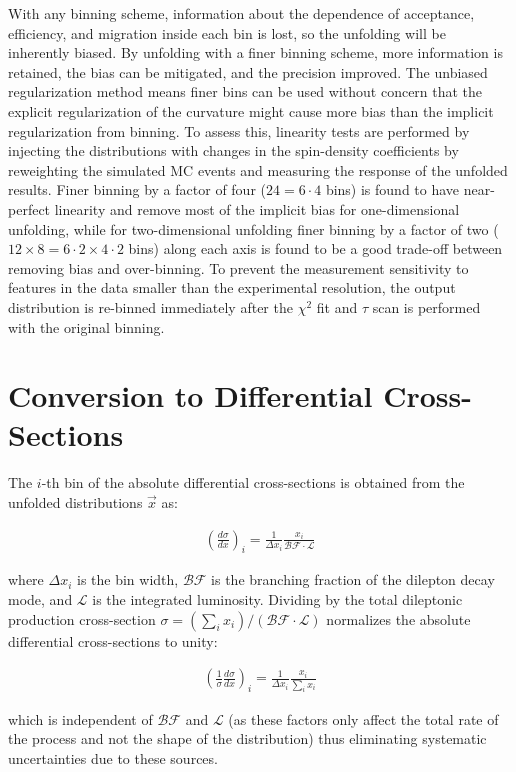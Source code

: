 \begin{refsection}
With any binning scheme, information about the dependence of acceptance, efficiency, and migration inside each bin is lost, so the unfolding will be inherently biased.
By unfolding with a finer binning scheme, more information is retained, the bias can be mitigated, and the precision improved.
The unbiased regularization method means finer bins can be used without concern that the explicit regularization of the curvature might cause more bias than the implicit regularization from binning.
To assess this, linearity tests are performed by injecting the distributions with changes in the spin-density coefficients by reweighting the simulated MC events and measuring the response of the unfolded results.
Finer binning by a factor of four ($24 = 6 \cdot 4$ bins) is found to have near-perfect linearity and remove most of the implicit bias for one-dimensional unfolding, while for two-dimensional unfolding finer binning by a factor of two ($12 \times 8 = 6 \cdot 2 \times 4 \cdot 2$ bins) along each axis is found to be a good trade-off between removing bias and over-binning.
To prevent the measurement sensitivity to features in the data smaller than the experimental resolution, the output distribution is re-binned immediately after the $\chi^2$ fit and $\tau$ scan is performed with the original binning.

\section{Conversion to Differential Cross-Sections}
The $i$-th bin of the absolute differential cross-sections is obtained from the unfolded distributions $\vec{x}$ as:
\begin{linenomath*}
\begin{align}
\left( \frac{d\sigma}{dx} \right)_i = \frac{1}{\Delta x_i} \frac{x_i}{\mathcal{BF} \cdot \mathcal{L}} 
\end{align}
\end{linenomath*}
where $\Delta x_i$ is the bin width, $\mathcal{BF}$ is the branching fraction of the \ttbar dilepton decay mode, and $\mathcal{L}$ is the integrated luminosity.
Dividing by the total dileptonic \ttbar production cross-section $\sigma =  (\sum_i x_i) / (\mathcal{BF} \cdot \mathcal{L})$ normalizes the absolute differential cross-sections to unity:
\begin{linenomath*}
\begin{align}
\left( \frac{1}{\sigma} \frac{d\sigma}{dx} \right)_i = \frac{1}{\Delta x_i} \frac{x_i}{\sum_i x_i} 
\end{align}
\end{linenomath*}
which is independent of $\mathcal{BF}$ and $\mathcal{L}$ (as these factors only affect the total rate of the process and not the shape of the distribution) thus eliminating systematic uncertainties due to these sources.


\end{refsection}
